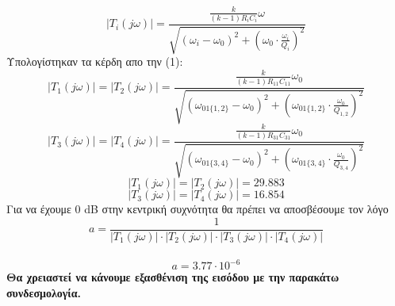 \documentclass{article}
\begin{document}
{{\begin{equation}
|{T}_i(jω)| = \frac{\frac{k}{(k-1)R_{i}C_{i}}ω}{\sqrt{(ω_i - ω_0)^2 + (ω_0 \cdot \frac{ω_i}{Q_i})^2}}
\end{equation}
Υπολογίστηκαν τα κέρδη απο την (1):
\begin{equation*}
|T_1(jω)| = |T_2(jω)| = \frac{\frac{k}{(k-1)R_{11}C_{11}}ω_0}{\sqrt{(ω_{01\{1,2\}} - ω_0)^2 + (ω_{01\{1,2\}} \cdot \frac{ω_0}{Q_{1,2}})^2}}
\end{equation*}
\begin{equation*}
|T_3(jω)| = |T_4(jω)| = \frac{\frac{k}{(k-1)R_{31}C_{31}}ω_0}{\sqrt{(ω_{01\{3,4\}} - ω_0)^2 + (ω_{01\{3,4\}} \cdot \frac{ω_0}{Q_{3,4}})^2}}
\end{equation*}
\begin{equation*}
\boxed{
|T_1(jω)| = |T_2(jω)| =  29.883
}
\end{equation*}
\begin{equation*}
\boxed{
|T_3(jω)| = |T_4(jω)| = 16.854
}
\end{equation*}
Για να έχουμε 0 dB στην κεντρική συχνότητα θα πρέπει να αποσβέσουμε τον λόγο 
\begin{equation*}
a = \frac{1}{|T_1(jω)| \cdot  |T_2(jω)| \cdot |T_3(jω)| \cdot |T_4(jω)|  }
\end{equation*}
\\[0.1\baselineskip]
\begin{equation*}
\boxed{a = 3.77 \cdot 10^{-6}}
\end{equation*}
\textbf{Θα χρειαστεί να κάνουμε εξασθένιση της εισόδου με την παρακάτω συνδεσμολογία.}\\
\begin{figure}[h!]
\centering
 	

\end{figure}}}
\end{document}
